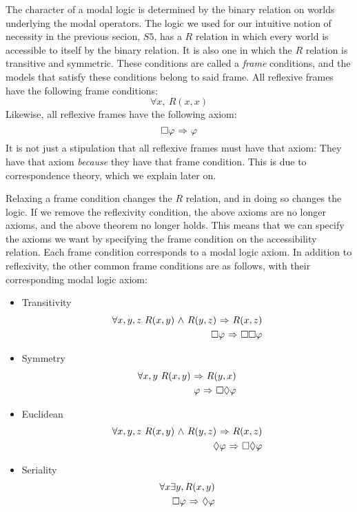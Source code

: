 The character of a modal logic is determined by the binary relation on worlds underlying the modal operators. The logic we used for our intuitive notion of necessity in the previous secion, $\mathit{S5}$, has a $R$ relation in which every world is accessible to itself by the binary relation. It is also one in which the $R$ relation is transitive and symmetric. These conditions are called a \emph{frame} conditions, and the models that satisfy these conditions belong to said frame. All reflexive frames have the following frame conditions:
\begin{equation}
\forall x,\ R(x,x)
\end{equation}
Likewise, all reflexive frames have the following axiom:
\begin{equation}
	\Box \varphi {\ \Rightarrow \ } \varphi
\end{equation}
It is not just a stipulation that all reflexive frames must have that axiom: They have that axiom \emph{because} they have that frame condition. This is due to correspondence theory, which we explain later on.

Relaxing a frame condition changes the $R$ relation, and in doing so changes the logic. If we remove the reflexivity condition, the above axioms are no longer axioms, and the above theorem no longer holds. This means that we can specify the axioms we want by specifying the frame condition on the accessibility relation. Each frame condition corresponds to a modal logic axiom. In addition to reflexivity, the other common frame conditions are as follows, with their corresponding modal logic axiom:
\begin{itemize}
	\item Transitivity
	\begin{eqnarray}
	\forall x,y,z\ R(x,y) {\ \wedge \ } R(y,z) {\ \Rightarrow \ } R(x,z)\\
	\Box \varphi {\ \Rightarrow \ } \Box \Box \varphi
	\end{eqnarray}
	\item Symmetry
	\begin{eqnarray}
	\forall x,y\ R(x,y) {\ \Rightarrow \ } R(y,x)\\
	\varphi {\ \Rightarrow \ } \Box \Diamond \varphi
	\end{eqnarray}
	\item Euclidean
	\begin{eqnarray}
	\forall x,y,z\ R(x,y) {\ \wedge \ } R(y,z) {\ \Rightarrow \ } R(x,z)\\
	\Diamond \varphi {\ \Rightarrow \ } \Box \Diamond \varphi
	\end{eqnarray}
	\item Seriality
	\begin{eqnarray}
	\forall x \exists y, R(x,y) \\
	\Box \varphi {\ \Rightarrow \ } \Diamond \varphi
	\end{eqnarray}
\end{itemize}

